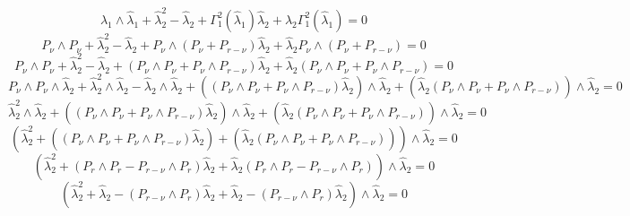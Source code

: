\documentclass[aps,preprint]{revtex4}%
\begin{document}
\begin{equation}
\hat{\lambda}_{1}\wedge\hat{\lambda}_{1}+\hat{\lambda}_{2}^{2}-\hat{\lambda
}_{2}+\Gamma_{1}^{2}\left(  \hat{\lambda}_{1}\right)  \hat{\lambda}_{2}%
+\hat{\lambda}_{2}\Gamma_{1}^{2}\left(  \hat{\lambda}_{1}\right)  =0
\end{equation}%
\begin{equation}
P_{\nu}\wedge P_{\nu}+\hat{\lambda}_{2}^{2}-\hat{\lambda}_{2}+P_{\nu}%
\wedge\left(  P_{\nu}+P_{r-\nu}\right)  \hat{\lambda}_{2}+\hat{\lambda}%
_{2}P_{\nu}\wedge\left(  P_{\nu}+P_{r-\nu}\right)  =0
\end{equation}%
\begin{equation}
P_{\nu}\wedge P_{\nu}+\hat{\lambda}_{2}^{2}-\hat{\lambda}_{2}+\left(  P_{\nu
}\wedge P_{\nu}+P_{\nu}\wedge P_{r-\nu}\right)  \hat{\lambda}_{2}+\hat
{\lambda}_{2}\left(  P_{\nu}\wedge P_{\nu}+P_{\nu}\wedge P_{r-\nu}\right)  =0
\end{equation}%
\begin{equation}
P_{\nu}\wedge P_{\nu}\wedge\hat{\lambda}_{2}+\hat{\lambda}_{2}^{2}\wedge
\hat{\lambda}_{2}-\hat{\lambda}_{2}\wedge\hat{\lambda}_{2}+\left(  \left(
P_{\nu}\wedge P_{\nu}+P_{\nu}\wedge P_{r-\nu}\right)  \hat{\lambda}%
_{2}\right)  \wedge\hat{\lambda}_{2}+\left(  \hat{\lambda}_{2}\left(  P_{\nu
}\wedge P_{\nu}+P_{\nu}\wedge P_{r-\nu}\right)  \right)  \wedge\hat{\lambda
}_{2}=0
\end{equation}%
\begin{equation}
\hat{\lambda}_{2}^{2}\wedge\hat{\lambda}_{2}+\left(  \left(  P_{\nu}\wedge
P_{\nu}+P_{\nu}\wedge P_{r-\nu}\right)  \hat{\lambda}_{2}\right)  \wedge
\hat{\lambda}_{2}+\left(  \hat{\lambda}_{2}\left(  P_{\nu}\wedge P_{\nu
}+P_{\nu}\wedge P_{r-\nu}\right)  \right)  \wedge\hat{\lambda}_{2}=0
\end{equation}%
\begin{equation}
\left(  \hat{\lambda}_{2}^{2}+\left(  \left(  P_{\nu}\wedge P_{\nu}+P_{\nu
}\wedge P_{r-\nu}\right)  \hat{\lambda}_{2}\right)  +\left(  \hat{\lambda}%
_{2}\left(  P_{\nu}\wedge P_{\nu}+P_{\nu}\wedge P_{r-\nu}\right)  \right)
\right)  \wedge\hat{\lambda}_{2}=0
\end{equation}%
\begin{equation}
\left(  \hat{\lambda}_{2}^{2}+\left(  P_{r}\wedge P_{r}-P_{r-\nu}\wedge
P_{r}\right)  \hat{\lambda}_{2}+\hat{\lambda}_{2}\left(  P_{r}\wedge
P_{r}-P_{r-\nu}\wedge P_{r}\right)  \right)  \wedge\hat{\lambda}_{2}=0
\end{equation}%
\begin{equation}
\left(  \hat{\lambda}_{2}^{2}+\hat{\lambda}_{2}-\left(  P_{r-\nu}\wedge
P_{r}\right)  \hat{\lambda}_{2}+\hat{\lambda}_{2}-\left(  P_{r-\nu}\wedge
P_{r}\right)  \hat{\lambda}_{2}\right)  \wedge\hat{\lambda}_{2}=0
\end{equation}%
\end{document}
